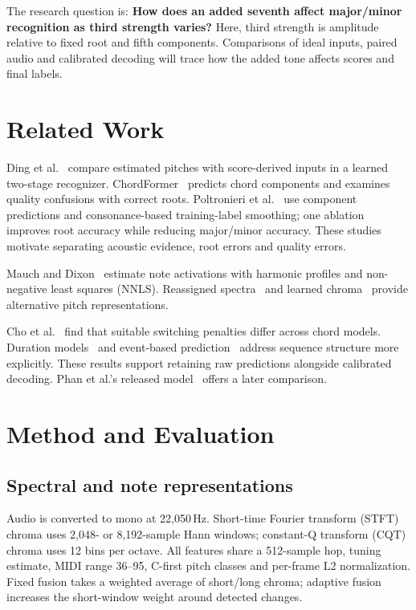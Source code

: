 \documentclass{article}
\begin{document}
The research question is: \textbf{How does an added seventh affect major/minor recognition as third strength varies?} Here, third strength is amplitude relative to fixed root and fifth components. Comparisons of ideal inputs, paired audio and calibrated decoding will trace how the added tone affects scores and final labels.

\section{Related Work}
Ding et al.\ \cite{ding2026} compare estimated pitches with score-derived inputs in a learned two-stage recognizer. ChordFormer\ \cite{akram2026} predicts chord components and examines quality confusions with correct roots. Poltronieri et al.\ \cite{poltronieri2025} use component predictions and consonance-based training-label smoothing; one ablation improves root accuracy while reducing major/minor accuracy. These studies motivate separating acoustic evidence, root errors and quality errors.

Mauch and Dixon\ \cite{mauch2010} estimate note activations with harmonic profiles and non-negative least squares (NNLS). Reassigned spectra\ \cite{khadkevich2013} and learned chroma\ \cite{korzeniowski2016} provide alternative pitch representations. 

Cho et al.\ \cite{cho2010} find that suitable switching penalties differ across chord models. Duration models\ \cite{korzeniowski2018} and event-based prediction\ \cite{kim2026} address sequence structure more explicitly. These results support retaining raw predictions alongside calibrated decoding. Phan et al.'s released model\ \cite{phan2026} offers a later comparison.

\section{Method and Evaluation}
\label{sec:method}
\subsection{Spectral and note representations}
Audio is converted to mono at 22,050\,Hz. Short-time Fourier transform (STFT) chroma uses 2,048- or 8,192-sample Hann windows; constant-Q transform (CQT) chroma uses 12 bins per octave. All features share a 512-sample hop, tuning estimate, MIDI range 36--95, C-first pitch classes and per-frame L2 normalization. Fixed fusion takes a weighted average of short/long chroma; adaptive fusion increases the short-window weight around detected changes.
\end{document}
